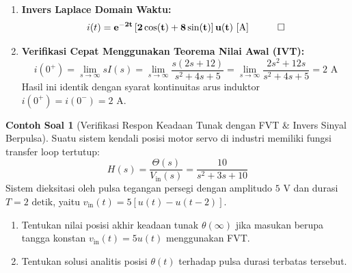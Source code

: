 \documentclass[11pt,a4paper]{article}
\theoremstyle{definition}
\newtheorem{example}{Contoh Soal}[section]
\begin{document}
\begin{enumerate}[leftmargin=*]
    Melengkapkan kuadrat pada penyebut:
    \begin{equation*}
        s^2 + 4s + 5 = (s + 2)^2 + 1^2
    \end{equation*}
    Tulis pembilang dalam kombinasi basis $(s + 2)$ dan $\omega_d = 1$:
    \begin{equation*}
        2s + 12 = 2(s + 2) + 8 = 2(s + 2) + 8(1)
    \end{equation*}
    Maka ekspresi $I(s)$ menjadi:
    \begin{equation*}
        I(s) = 2 \cdot \frac{s + 2}{(s + 2)^2 + 1^2} + 8 \cdot \frac{1}{(s + 2)^2 + 1^2}
    \end{equation*}
    
    \item \textbf{Invers Laplace Domain Waktu:}
    \begin{equation*}
        i(t) = \mathbf{e^{-2t} \left[ 2 \cos(t) + 8 \sin(t) \right] u(t)\text{ [A]}} \quad \qed
    \end{equation*}
    
    \item \textbf{Verifikasi Cepat Menggunakan Teorema Nilai Awal (IVT):}
    \begin{equation*}
        i(0^+) = \lim_{s \to \infty} s I(s) = \lim_{s \to \infty} \frac{s(2s + 12)}{s^2 + 4s + 5} = \lim_{s \to \infty} \frac{2s^2 + 12s}{s^2 + 4s + 5} = 2\text{ A}
    \end{equation*}
    Hasil ini identik dengan syarat kontinuitas arus induktor $i(0^+) = i(0^-) = 2\text{ A}$.
\end{enumerate}

\begin{example}[Verifikasi Respon Keadaan Tunak dengan FVT \& Invers Sinyal Berpulsa]
Suatu sistem kendali posisi motor servo di industri memiliki fungsi transfer loop tertutup:
\begin{equation*}
    H(s) = \frac{\Theta(s)}{V_{\text{in}}(s)} = \frac{10}{s^2 + 3s + 10}
\end{equation*}
Sistem dieksitasi oleh pulsa tegangan persegi dengan amplitudo $5\text{ V}$ dan durasi $T = 2\text{ detik}$, yaitu $v_{\text{in}}(t) = 5[u(t) - u(t - 2)]$.
\begin{enumerate}[leftmargin=*]
    \item Tentukan nilai posisi akhir keadaan tunak $\theta(\infty)$ jika masukan berupa tangga konstan $v_{\text{in}}(t) = 5 u(t)$ menggunakan FVT.
    \item Tentukan solusi analitis posisi $\theta(t)$ terhadap pulsa durasi terbatas tersebut.
\end{enumerate}
\end{example}
\end{document}

